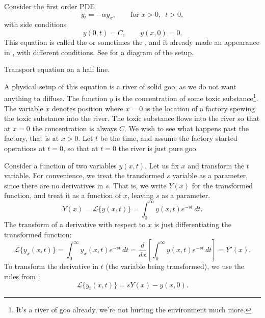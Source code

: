 \begin{example}
Consider the first order PDE
\begin{equation*}
y_t = - \alpha y_x, \qquad \text{for } x > 0, \enspace t > 0,
\end{equation*}
with side conditions
\begin{equation*}
y(0,t) = C, \qquad y(x,0) = 0 .
\end{equation*}
This equation is 
called the \emph{} or sometimes
the \emph{}, and it already made
an appearance in , with different conditions.
See  for a diagram of the setup.

\begin{mywrapfig}{3.1in}
\capstart
{}
\caption{Transport equation on a half line.\label{lt:half-infinite-goo-river}}
\end{mywrapfig}

A physical setup of this equation is a river of solid goo,
as we do not want anything to diffuse.  The function
$y$ is the concentration of
some toxic substance\footnote{It's a river of goo already,
we're not hurting the environment much more.}.
The variable $x$ denotes position where $x=0$
is the location of a factory spewing the toxic substance into the
river.  The toxic substance flows into the river so that at $x=0$ the
concentration is always $C$.  We wish to see what happens past the factory,
that is at $x > 0$.  Let $t$ be the time, and assume
the factory started operations at $t=0$, so that at $t=0$ the river is just
pure goo.

Consider a function of two variables $y(x,t)$.
Let us fix $x$ and transform the $t$ variable.
For convenience, we treat the transformed $s$
variable as a parameter, since there are no derivatives in $s$.
That is, we write $Y(x)$ for the transformed function,
and treat it as a function of $x$, leaving $s$ as a parameter.
\begin{equation*}
Y(x)
= {\mathcal L} \bigl\{ y(x,t) \bigr\}
= \int_0^\infty y(x,t) e^{-st} \,dt .
\end{equation*}
The transform of a derivative with respect to $x$ is just differentiating 
the transformed function:
\begin{equation*}
{\mathcal L} \bigl\{ y_x(x,t) \bigr\} =
\int_0^\infty y_x(x,t) e^{-st} \,dt
=
\frac{d}{dx} \left[\int_0^\infty y(x,t) e^{-st} \,dt \right]
=
Y'(x) .
\end{equation*}
To transform the derivative in $t$ (the variable being transformed),
we use the rules from :
\begin{equation*}
{\mathcal L} \bigl\{ y_t(x,t) \bigr\} 
=
sY(x) - y(x,0) .
\end{equation*}


\end{example}
